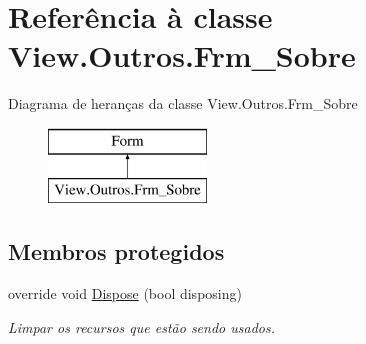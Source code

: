 \hypertarget{class_view_1_1_outros_1_1_frm___sobre}{}\section{Referência à classe View.\+Outros.\+Frm\+\_\+\+Sobre}
\label{class_view_1_1_outros_1_1_frm___sobre}
Diagrama de heranças da classe View.\+Outros.\+Frm\+\_\+\+Sobre\begin{figure}[H]
\begin{center}
\leavevmode
\includegraphics[height=2.000000cm]{class_view_1_1_outros_1_1_frm___sobre}
\end{center}
\end{figure}
\subsection*{Membros protegidos}
\begin{DoxyCompactItemize}
\item 
override void \hyperlink{class_view_1_1_outros_1_1_frm___sobre_ae508ccd5e120c0e538c60a89cd4cdf16}{Dispose} (bool disposing)
\begin{DoxyCompactList}\small\item\em Limpar os recursos que estão sendo usados. \end{DoxyCompactList}\end{DoxyCompactItemize}

